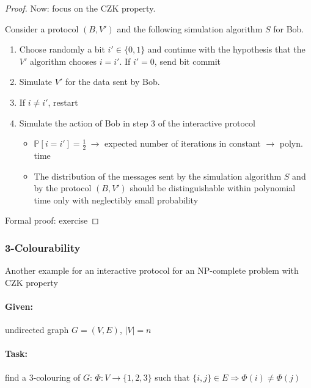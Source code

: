 \documentclass[11pt]{article}
\theoremstyle{definition}
\theoremstyle{definition}
\begin{document}
\begin{proof}
Now: focus on the CZK property.

Consider a protocol $ (B, V') $ and the following simulation algorithm $ S $ for Bob.

\begin{enumerate}
\item Choose randomly a bit $ i' \in \{0, 1 \} $ and continue with the hypothesis that the $ V' $ algorithm chooses $ i = i' $. If $ i' = 0 $, send bit commit
\item Simulate $ V' $ for the data sent by Bob.
\item If $ i \neq i' $, restart
\item Simulate the action of Bob in step 3 of the interactive protocol
	\begin{itemize}
	\item $ \mathbb{P}[i = i'] = \frac{1}{2} ~ \rightarrow $ expected number of iterations in constant $ \rightarrow $ polyn. time
	\item The distribution of the messages sent by the simulation algorithm $ S $ and by the protocol $ (B, V') $ should be distinguishable within polynomial time only with neglectibly small probability
	\end{itemize}
\end{enumerate}
Formal proof: exercise

\end{proof}

\subsubsection{3-Colourability}
Another example for an interactive protocol for an NP-complete problem with CZK property

\paragraph{Given:} undirected graph $ G = (V, E) $, $ | V | = n $
\paragraph{Task:} find a 3-colouring of $ G $: $ \Phi: V \rightarrow \{1, 2, 3\} $ such that $ \{i, j \} \in E \Rightarrow \Phi(i) \neq \Phi(j) $
\end{document}
